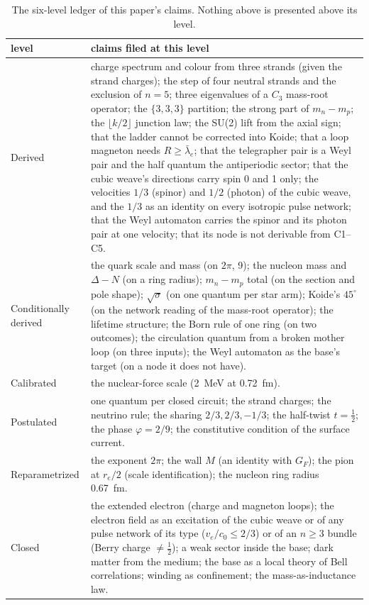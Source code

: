 \documentclass[11pt,a4paper]{article}
\theoremstyle{plain}
\theoremstyle{remark}
\newcommand{\lb}{\ensuremath{\bar\lambda_e}}
\begin{document}
\begin{table}[h]
\centering\small
\begin{tabular}{p{7.2cm}p{7.6cm}}
\toprule
level & claims filed at this level \\
\midrule
Derived & charge spectrum and colour from three strands (given the strand charges); the step of
four neutral strands and the exclusion of $n = 5$; three eigenvalues of a $C_3$ mass-root
operator; the $\{3,3,3\}$ partition; the strong part of $m_n - m_p$; the $\lfloor k/2\rfloor$
junction law; the SU(2) lift from the axial sign; that the ladder cannot be corrected into Koide;
that a loop magneton needs $R \ge \lb$; that the telegrapher pair is a Weyl pair and the half
quantum the antiperiodic sector; that the cubic weave's directions carry spin 0 and 1 only; the
velocities $1/3$ (spinor) and $1/2$ (photon) of the cubic weave, and the $1/3$ as an identity on
every isotropic pulse network; that the Weyl automaton carries the spinor and its photon pair at
one velocity; that its node is not derivable from C1--C5. \\
\addlinespace
Conditionally derived & the quark scale and mass (on $2\pi$, 9); the nucleon mass and
$\Delta - N$ (on a ring radius); $m_n - m_p$ total (on the section and pole shape);
$\sqrt\sigma$ (on one quantum per star arm); Koide's $45^\circ$ (on the network reading of the
mass-root operator); the lifetime structure; the Born rule of one ring (on two outcomes); the
circulation quantum from a broken mother loop (on three inputs); the Weyl automaton as the
base's target (on a node it does not have). \\
\addlinespace
Calibrated & the nuclear-force scale (2~MeV at 0.72~fm). \\
\addlinespace
Postulated & one quantum per closed circuit; the strand charges; the neutrino rule; the sharing
$2/3, 2/3, -1/3$; the half-twist $t = \tfrac12$; the phase $\varphi = 2/9$; the constitutive
condition of the surface current. \\
\addlinespace
Reparametrized & the exponent $2\pi$; the wall $M$ (an identity with $G_F$); the pion at $r_e/2$
(scale identification); the nucleon ring radius 0.67~fm. \\
\addlinespace
Closed & the extended electron (charge and magneton loops); the electron field as an excitation
of the cubic weave or of any pulse network of its type ($v_e/c_0 \le 2/3$) or of an $n \ge 3$
bundle (Berry charge $\ne \tfrac12$); a weak sector inside the base; dark matter from the medium;
the base as a local theory of Bell correlations; winding as confinement; the mass-as-inductance
law. \\
\bottomrule
\end{tabular}
\caption{The six-level ledger of this paper's claims. Nothing above is presented above its level.}
\end{table}
\end{document}
